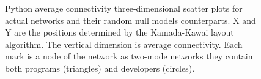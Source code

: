\begin{figure}[p]
\hspace{.01in}

\caption[Python average connectivity three-dimensional scatter plots.]{Python average connectivity three-dimensional scatter plots for actual networks and their random null models counterparts. X and Y are the positions determined by the Kamada-Kawai layout algorithm. The vertical dimension is average connectivity. Each mark is a node of the network as two-mode networks they contain both programs (triangles) and developers (circles).}
\label{fig:python-s3d}
\end{figure}

